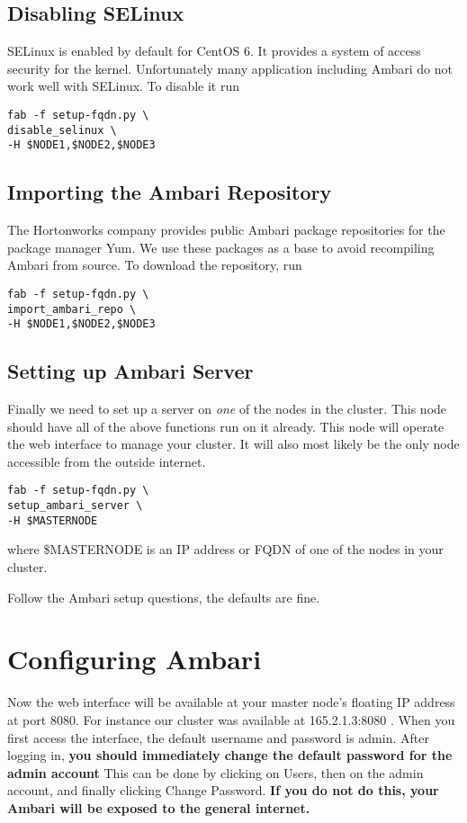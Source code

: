 \documentclass[9pt,twocolumn,twoside]{idsi}
\begin{document}
\subsection{Disabling SELinux}
SELinux is enabled by default for CentOS 6. It provides a system of access security for the kernel. Unfortunately many application including Ambari do not work well with SELinux. To disable it run

\begin{verbatim}
fab -f setup-fqdn.py \
disable_selinux \
-H $NODE1,$NODE2,$NODE3
\end{verbatim}

\subsection{Importing the Ambari Repository}
The Hortonworks company provides public Ambari package repositories for the package manager Yum. We use these packages as a base to avoid recompiling Ambari from source. To download the repository, run

\begin{verbatim}
fab -f setup-fqdn.py \
import_ambari_repo \
-H $NODE1,$NODE2,$NODE3
\end{verbatim}

\subsection{Setting up Ambari Server}

Finally we need to set up a server on \emph{one} of the nodes in the cluster. This node should have all of the above functions run on it already. This node will operate the web interface to manage your cluster. It will also most likely be the only node accessible from the outside internet.

\begin{verbatim}
fab -f setup-fqdn.py \
setup_ambari_server \
-H $MASTERNODE
\end{verbatim}

where \$MASTERNODE is an IP address or FQDN of one of the nodes in your cluster.

Follow the Ambari setup questions, the defaults are fine.

\section{Configuring Ambari}
Now the web interface will be available at your master node's floating IP address at port 8080. For instance our cluster was available at 165.2.1.3:8080 . When you first access the interface, the default username and password is admin. After logging in, \textbf{you should immediately change the default password for the admin account} This can be done by clicking on Users, then on the admin account, and finally clicking Change Password. \textbf{If you do not do this, your Ambari will be exposed to the general internet.}
\end{document}
